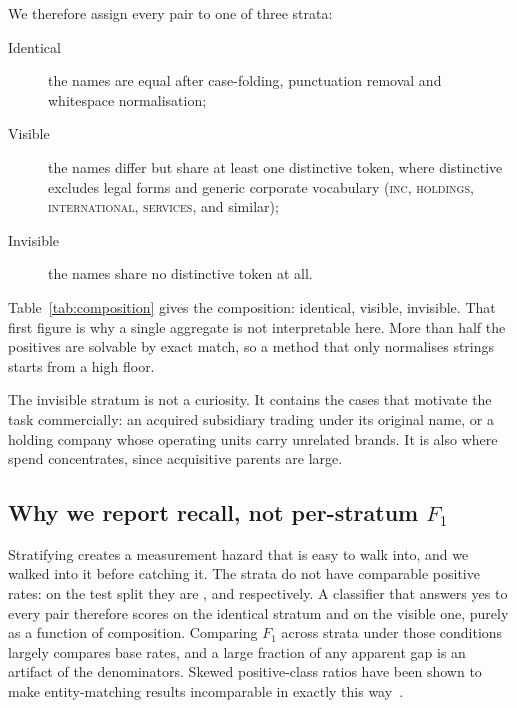 We therefore assign every pair to one of three strata:

\begin{description}
\item[Identical] the names are equal after case-folding, punctuation removal and
whitespace normalisation;
\item[Visible] the names differ but share at least one distinctive token, where
distinctive excludes legal forms and generic corporate vocabulary (\textsc{inc},
\textsc{holdings}, \textsc{international}, \textsc{services}, and similar);
\item[Invisible] the names share no distinctive token at all.
\end{description}

Table~\ref{tab:composition} gives the composition: \BenchPosIdenticalPct identical,
\BenchPosVisiblePct visible, \BenchPosInvisiblePct invisible. That first figure is why a
single aggregate is not interpretable here. More than half the positives are solvable
by exact match, so a method that only normalises strings starts from a high floor.



The invisible stratum is not a curiosity. It contains the cases that motivate the task
commercially: an acquired subsidiary trading under its original name, or a holding
company whose operating units carry unrelated brands. It is also where spend
concentrates, since acquisitive parents are large.

\subsection{Why we report recall, not per-stratum $F_1$}
\label{sec:whyrecall}

Stratifying creates a measurement hazard that is easy to walk into, and we walked into
it before catching it. The strata do not have comparable positive rates: on the test
split they are \BaseIdenticalRate, \BaseVisibleRate and \BaseInvisibleRate respectively.
A classifier that answers yes to every pair therefore scores \BaseIdenticalF on the
identical stratum and \BaseVisibleF on the visible one, purely as a function of
composition. Comparing $F_1$ across strata under those conditions largely compares base
rates, and a large fraction of any apparent gap is an artifact of the denominators.
Skewed positive-class ratios have been shown to make entity-matching results
incomparable in exactly this way~\citep{li2022bridging}.

